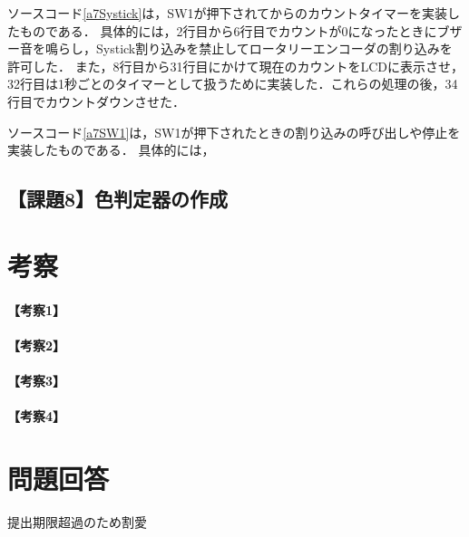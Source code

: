 \documentclass{jlreq}
\begin{document}
ソースコード\ref{a7Systick}は，SW1が押下されてからのカウントタイマーを実装したものである．
具体的には，2行目から6行目でカウントが0になったときにブザー音を鳴らし，Systick割り込みを禁止してロータリーエンコーダの割り込みを許可した．
また，8行目から31行目にかけて現在のカウントをLCDに表示させ，32行目は1秒ごとのタイマーとして扱うために実装した．これらの処理の後，34行目でカウントダウンさせた．

ソースコード\ref{a7SW1}は，SW1が押下されたときの割り込みの呼び出しや停止を実装したものである．
具体的には，

\subsection{【課題8】色判定器の作成}

\section{考察}
\paragraph{【考察1】}

\paragraph{【考察2】}

\paragraph{【考察3】}

\paragraph{【考察4】}

\section{問題回答}
提出期限超過のため割愛
\end{document}
